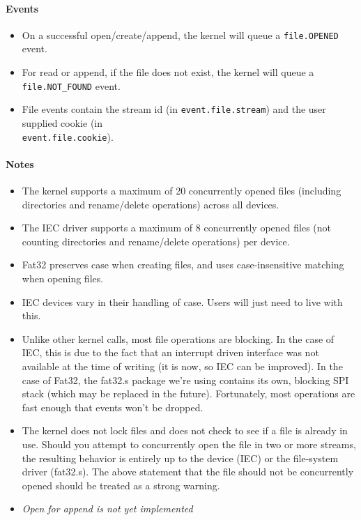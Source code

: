 \paragraph{Events}
\begin{itemize}
\item On a successful open/create/append, the kernel will queue a \verb+file.OPENED+ event.
\item For read or append, if the file does not exist, the kernel will queue a \verb+file.NOT_FOUND+ event.
\item File events contain the stream id (in \verb+event.file.stream+) and the user supplied cookie (in\\ \verb+event.file.cookie+).
\end{itemize}

\paragraph{Notes}
\begin{itemize}
\item The kernel supports a maximum of 20 concurrently opened files (including directories and rename/delete operations) across all devices.
\item The IEC driver supports a maximum of 8 concurrently opened files (not counting directories and rename\-/delete operations) per device. 
\item Fat32 preserves case when creating files, and uses case-insensitive matching when opening files.
\item IEC devices vary in their handling of case.  Users will just need to live with this.
\item Unlike other kernel calls, most file operations are blocking.  In the case of IEC, this is due to the fact that an interrupt driven interface was not available at the time of writing (it is now, so IEC can be improved).  In the case of Fat32, the fat32.s package we're using contains its own, blocking SPI stack (which may be replaced in the future).  Fortunately, most operations are fast enough that events won't be dropped.
\item The kernel does not lock files and does not check to see if a file is already in use.  Should you attempt to concurrently open the file in two or more streams, the resulting behavior is entirely up to the device (IEC) or the file-system driver (fat32.s).  The above statement that the file should not be concurrently opened should be treated as a strong warning. 
\item {\em Open for append is not yet implemented}
\end{itemize}



